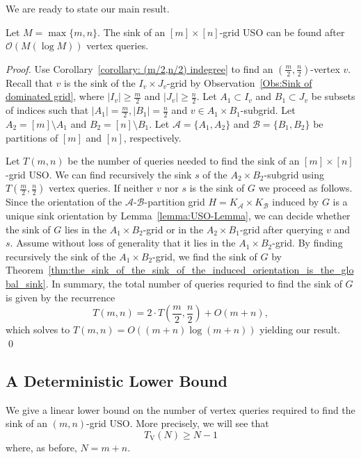 \documentclass[runningheads,a4paper]{llncs}
\newcommand{\A}{\ensuremath{\mathcal A}}
\newcommand{\B}{\ensuremath{\mathcal B}}
\newcommand{\timeVertex}{\ensuremath{T_\mathrm{V}}}
\begin{document}
We are ready to state our main result. 
\begin{theorem}\label{theorem:Sink algorithm}
 Let $M = \max\{m,n\}$. The sink of an $[m]\times[n]$-grid USO can be found after $\mathcal{O}(M(\log M))$ vertex queries.
\end{theorem}
\begin{proof}
Use Corollary~\ref{corollary: (m/2,n/2) indegree} to find an $(\frac{m}{2}, \frac{n}{2})$-vertex $v$. 
Recall that $v$ is the sink of the $I_v\times J_v$-grid by Observation~\ref{Obs:Sink of dominated grid}, where $|I_v| \geq \frac{m}{2}$ and $|J_v|\geq \frac{n}{2}$. Let $A_1\subset I_v$ and $B_1\subset J_v$ be subsets of indices such that $|A_1| = \frac{m}{2}, |B_1| = \frac{n}{2}$ and $v\in A_1\times B_1$-subgrid.
Let $A_2= [m]\setminus A_1$ and $B_2 = [n]\setminus B_1$.
Let $\A = \{A_1, A_2\}$ and $\B = \{B_1, B_2\}$ be partitions of $[m]$ and $[n]$, respectively.

Let $T(m, n)$ be the number of queries needed to find the sink of an $[m]\times[n]$-grid USO.
We can find recursively the sink $s$ of the $A_2\times B_2$-subgrid using $T(\frac{m}{2}, \frac{n}{2})$ vertex queries. 
If neither $v$ nor $s$ is the sink of $G$ we proceed as follows.
Since the orientation of the $\A$-$\B$-partition grid $H = K_\A \times K_\B$ induced by $G$ is a unique sink orientation by Lemma~\ref{lemma:USO-Lemma}, we can decide whether the sink of $G$ lies in the $A_1\times B_2$-grid or in the $A_2\times B_1$-grid after querying $v$ and $s$. Assume without loss of generality that it lies in the $A_1\times B_2$-grid.
By finding recursively the sink of the $A_1\times B_2$-grid, we find the sink of $G$ by Theorem~\ref{thm:the_sink_of_the_sink_of_the_induced_orientation_is_the_global_sink}. In summary, the total number of queries requried to find the sink of $G$ is given by the recurrence
$$T(m, n) = 2\cdot T\left(\frac{m}{2}, \frac{n}{2}\right) + O(m+n),$$
which solves to $T(m, n) = O((m+n) \log (m+n))$ yielding our result. \qed
\end{proof}
 
\subsection{A Deterministic Lower Bound}
\label{section:a_deterministic_lower_bound}

We give a linear lower bound on the number of vertex queries required to find
the sink of an $(m,n)$-grid USO.
More precisely, we will see that
\[
    \timeVertex(N) \ge N-1
\]
where, as before, $N = m+n$.
\end{document}
